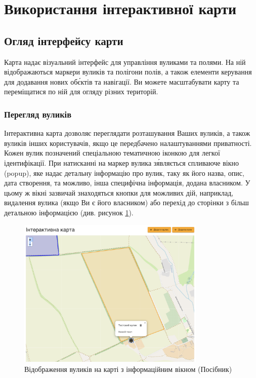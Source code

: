 
\section{Використання інтерактивної карти}
\label{sec:manual_map}

\subsection{Огляд інтерфейсу карти}
Карта надає візуальний інтерфейс для управління вуликами та полями. На ній відображаються маркери вуликів та полігони полів, а також елементи керування для додавання нових об\'єктів та навігації. Ви можете масштабувати карту та переміщатися по ній для огляду різних територій.

\subsubsection{Перегляд вуликів}
\label{subsec:manual_map_hives}
Інтерактивна карта дозволяє переглядати розташування Ваших вуликів, а також вуликів інших користувачів, якщо це передбачено налаштуваннями приватності. Кожен вулик позначений спеціальною тематичною іконкою для легкої ідентифікації. При натисканні на маркер вулика з\'являється спливаюче вікно (popup), яке надає детальну інформацію про вулик, таку як його назва, опис, дата створення, та можливо, інша специфічна інформація, додана власником. У цьому ж вікні зазвичай знаходяться кнопки для можливих дій, наприклад, видалення вулика (якщо Ви є його власником) або перехід до сторінки з більш детальною інформацією (див. рисунок \ref{fig:manual_map_hives_demo}).

\begin{figure}[htbp]
    \centering
    \includegraphics[width=0.8\textwidth]{practice_report/images/map_hives_demo.png}
    \caption{Відображення вуликів на карті з інформаційним вікном (Посібник)}
    \label{fig:manual_map_hives_demo}
\end{figure}

